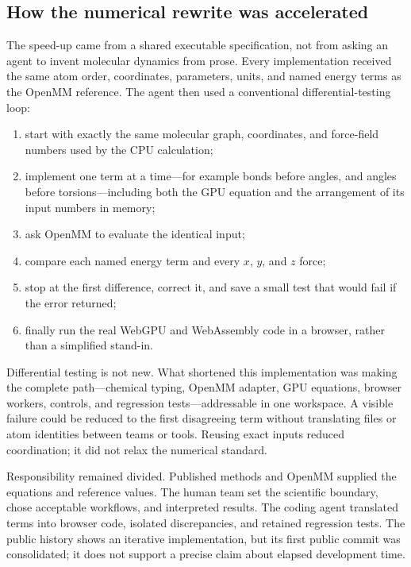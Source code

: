 \subsection{How the numerical rewrite was accelerated}
\label{app:agent-development}

The speed-up came from a shared executable specification, not from asking an
agent to invent molecular dynamics from prose. Every implementation received the
same atom order, coordinates, parameters, units, and named energy terms as the
OpenMM reference. The agent then used a conventional differential-testing loop:

\begin{enumerate}
  \item start with exactly the same molecular graph, coordinates, and
    force-field numbers used by the CPU calculation;
  \item implement one term at a time---for example bonds before angles, and
    angles before torsions---including both the GPU equation and the arrangement
    of its input numbers in memory;
  \item ask OpenMM to evaluate the identical input;
  \item compare each named energy term and every $x$, $y$, and $z$ force;
  \item stop at the first difference, correct it, and save a small test that
    would fail if the error returned;
  \item finally run the real WebGPU and WebAssembly code in a browser, rather
    than a simplified stand-in.
\end{enumerate}

Differential testing is not new. What shortened this implementation was making
the complete path---chemical typing, OpenMM adapter, GPU equations, browser
workers, controls, and regression tests---addressable in one workspace. A visible
failure could be reduced to the first disagreeing term without translating files
or atom identities between teams or tools. Reusing exact inputs reduced
coordination; it did not relax the numerical standard.

Responsibility remained divided. Published methods and OpenMM supplied the
equations and reference values. The human team set the scientific boundary,
chose acceptable workflows, and interpreted results. The coding agent translated
terms into browser code, isolated discrepancies, and retained regression tests.
The public history shows an iterative implementation, but its first public
commit was consolidated; it does not support a precise claim about elapsed
development time.

